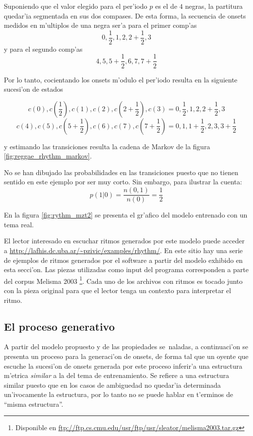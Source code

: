 Suponiendo que el valor elegido para el per'iodo $p$ es el de $4$ negras, la partitura quedar'ia segmentada en sus dos compases. 
De esta forma, la secuencia de onsets medidos en m'ultiplos de una negra ser'a para el primer comp'as
$$0, \frac{1}{2}, 1, 2, 2+\frac{1}{2}, 3$$
y para el segundo comp'as 
$$4, 5, 5+\frac{1}{2}, 6, 7, 7+\frac{1}{2}$$

Por lo tanto, cocientando los onsets m'odulo el per'iodo resulta en la siguiente sucesi'on de estados

$$c(0), c(\frac{1}{2}), c(1), c(2), c(2+\frac{1}{2}), c(3) = 0, \frac{1}{2}, 1, 2, 2+\frac{1}{2}, 3$$
$$c(4), c(5), c(5+\frac{1}{2}), c(6), c(7), c(7+\frac{1}{2}) = 0, 1, 1+\frac{1}{2}, 2, 3, 3+\frac{1}{2}$$

y estimando las transiciones resulta la cadena de Markov de la figura \ref{fig:reggae_rhythm_markov}.
\begin{imagen}
\end{imagen}

No se han dibujado las probabilidades en las transiciones puesto que no tienen sentido en este ejemplo por ser muy corto. Sin embargo, para ilustrar la cuenta:
$$p(1|0) = \frac{n(0, 1)}{n(0)} = \frac{1}{2}$$

En la figura \ref{fig:rythm_mzt2} se presenta el gr'afico del modelo entrenado con un tema real.
\begin{imagen}
    \width{5cm}
\end{imagen}

El lector interesado en escuchar ritmos generados por este modelo puede acceder a \url{http://lafhis.dc.uba.ar/~pzivic/examples/rhythm/}. 
En este sitio hay una serie de ejemplos de ritmos generados por el software a partir del modelo exhibido en esta secci'on. Las piezas 
utilizadas como input del programa corresponden a parte del corpus Melisma 2003 \footnote{Disponible en 
\url{ftp://ftp.cs.cmu.edu/usr/ftp/usr/sleator/melisma2003.tar.gz}}. Cada uno de los archivos con ritmos es tocado junto con la 
pieza original para que el lector tenga un contexto para interpretar el ritmo. 

\subsection{El proceso generativo}
A partir del modelo propuesto y de las propiedades se~naladas, a continuaci'on se presenta un proceso para la generaci'on de onsets, de forma tal 
que un oyente que escuche la sucesi'on de onsets generada por este proceso inferir'a una estructura m'etrica \emph{similar} a la del tema de 
entrenamiento. Se refiere a una estructura similar puesto que en los casos de ambiguedad no quedar'ia determinada un'ivocamente la estructura, por lo tanto
no se puede hablar en t'erminos de ``misma estructura''.

